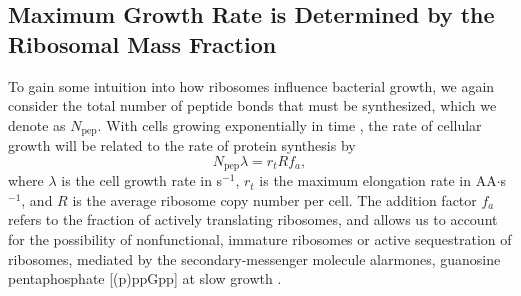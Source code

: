 \subsection{Maximum Growth Rate is Determined by the Ribosomal Mass Fraction}
To gain some intuition into how ribosomes influence
bacterial growth, we again consider the total number of peptide bonds that must
be synthesized, which we denote as $N_\text{pep}$. With cells growing exponentially in time
\citep{godin2010}, the rate of cellular growth will be related to the rate of protein synthesis by
\begin{equation}
    N_\text{pep} \lambda = r_t R f_a,
    \label{eq:mass_balance}
\end{equation}
where $\lambda$ is the cell growth rate in s$^{-1}$, $r_t$ is the maximum
elongation rate in AA$\cdot$s$^{-1}$, and $R$ is the average ribosome copy
number per cell. The addition factor $f_a$ refers to the fraction of actively
translating ribosomes, and allows us to account for the possibility of
nonfunctional, immature ribosomes or active sequestration of ribosomes, mediated
by the secondary-messenger molecule alarmones, guanosine pentaphosphate
[(p)ppGpp] at slow growth \citep{dennis2004, dai2016}.

